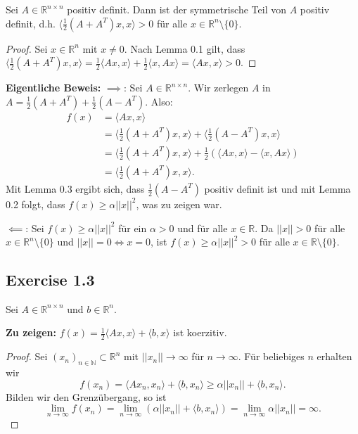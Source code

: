 \documentclass[a4paper, landscape,twocolumn,fontsize=9pt]{scrartcl}
\begin{document}
\begin{lemma}{}{}
	Sei $A \in \mathbb R^{n \times n}$ positiv definit. Dann ist der symmetrische Teil von $A$ positiv definit, d.h. $\langle \frac{1}{2}(A+A^T)x,x \rangle > 0$ für alle $x \in \mathbb R^n \setminus \{ 0 \}$.
\end{lemma}
\begin{proof}
	Sei $x \in \mathbb R^n$ mit $x \neq 0$. Nach Lemma 0.1 gilt, dass $\langle \frac{1}{2}(A+A^T)x,x \rangle = \frac{1}{2}\langle Ax, x \rangle + \frac{1}{2} \langle x,Ax \rangle = \langle Ax,x \rangle > 0$. 
\end{proof}

\textbf{Eigentliche Beweis:} $\implies$: Sei $A \in \mathbb R^{n \times n}$. Wir zerlegen $A$ in $A = \frac{1}{2}(A+A^T) + \frac{1}{2}(A-A^T)$. Also:
\begin{align*}
		f(x) &= \langle Ax,x \rangle \\
			 &= \langle \frac{1}{2}(A+A^T)x,x \rangle + \langle \frac{1}{2}(A-A^T)x,x \rangle\\
			 &= \langle \frac{1}{2}(A+A^T)x,x \rangle + \frac{1}{2}(\langle Ax,x \rangle - \langle x,Ax \rangle) \\
			 &= \langle \frac{1}{2}(A+A^T)x,x \rangle.
\end{align*}
Mit Lemma 0.3 ergibt sich, dass $\frac{1}{2}(A-A^T)$ positiv definit ist und mit Lemma 0.2 folgt, dass $f(x) \geq \alpha ||x||^2$, was zu zeigen war.

$\impliedby$: Sei $f(x) \geq \alpha ||x||^2$ für ein $\alpha > 0$ und für alle $x \in \mathbb R.$ Da $||x|| > 0$ für alle $x \in \mathbb R^n \setminus \{ 0 \}$ und $||x|| = 0 \iff x = 0$, ist $f(x) \geq \alpha ||x||^2 > 0$ für alle $x \in \mathbb R \setminus \{ 0 \}$.



\subsection*{Exercise 1.3}
Sei $A \in \mathbb R^{n \times n}$ und $b \in \mathbb R^n$.

\textbf{Zu zeigen:} $f(x) = \frac{1}{2}\langle Ax,x \rangle + \langle b,x \rangle$ ist koerzitiv.

\begin{proof}
	Sei $(x_n)_{n \in \mathbb N} \subset \mathbb R^n$ mit $||x_n|| \to \infty$ für $n \to \infty$. Für beliebiges $n$ erhalten wir
	\[
		f(x_n) = \langle Ax_n,x_n \rangle +\langle b,x_n \rangle \geq  \alpha || x_n || + \langle b,x_n \rangle.
	\]
	Bilden wir den Grenzübergang, so ist 
	\[
		\lim_{n \to \infty} f(x_n) = \lim_{n \to \infty} (\alpha || x_n || + \langle b,x_n \rangle) = \lim_{n \to \infty} \alpha || x_n || = \infty.
	\]
\end{proof}
\end{document}
